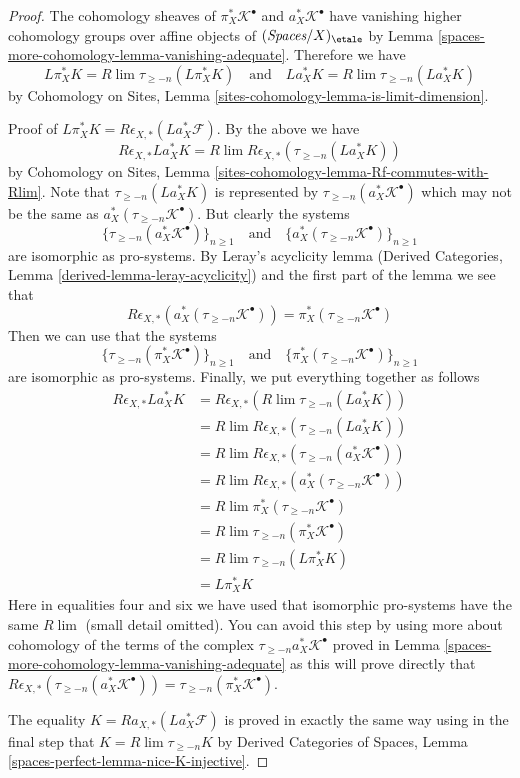 \begin{proof}
\medskip\noindent
The cohomology sheaves of
$\pi_X^*\mathcal{K}^\bullet$ and $a_X^*\mathcal{K}^\bullet$
have vanishing higher cohomology
groups over affine objects of $(\textit{Spaces}/X)_\etale$ by
Lemma \ref{spaces-more-cohomology-lemma-vanishing-adequate}.
Therefore we have
$$
L\pi_X^*K = R\lim \tau_{\geq -n}(L\pi_X^*K)
\quad\text{and}\quad
La_X^*K = R\lim \tau_{\geq -n}(La_X^*K)
$$
by Cohomology on Sites, Lemma \ref{sites-cohomology-lemma-is-limit-dimension}.

\medskip\noindent
Proof of $L\pi_X^*K = R\epsilon_{X, *}(La_X^*\mathcal{F})$.
By the above we have
$$
R\epsilon_{X, *}La_X^*K =
R\lim R\epsilon_{X, *}(\tau_{\geq -n}(La_X^*K))
$$
by Cohomology on Sites, Lemma
\ref{sites-cohomology-lemma-Rf-commutes-with-Rlim}.
Note that $\tau_{\geq -n}(La_X^*K)$ is represented by
$\tau_{\geq -n}(a_X^*\mathcal{K}^\bullet)$ which may not be the
same as $a_X^*(\tau_{\geq -n}\mathcal{K}^\bullet)$.
But clearly the systems
$$
\{\tau_{\geq -n}(a_X^*\mathcal{K}^\bullet)\}_{n \geq 1}
\quad\text{and}\quad
\{a_X^*(\tau_{\geq -n}\mathcal{K}^\bullet)\}_{n \geq 1}
$$
are isomorphic as pro-systems.
By Leray's acyclicity lemma
(Derived Categories, Lemma \ref{derived-lemma-leray-acyclicity})
and the first part of the lemma we see that
$$
R\epsilon_{X, *}(a_X^*(\tau_{\geq -n}\mathcal{K}^\bullet)) =
\pi_X^*(\tau_{\geq -n}\mathcal{K}^\bullet)
$$
Then we can use that the systems
$$
\{\tau_{\geq -n}(\pi_X^*\mathcal{K}^\bullet)\}_{n \geq 1}
\quad\text{and}\quad
\{\pi_X^*(\tau_{\geq -n}\mathcal{K}^\bullet)\}_{n \geq 1}
$$
are isomorphic as pro-systems. Finally, we put everything together as follows
\begin{align*}
R\epsilon_{X, *}La_X^*K
& =
R\epsilon_{X, *} (R\lim \tau_{\geq -n}(La_X^*K)) \\
& =
R\lim R\epsilon_{X, *}(\tau_{\geq -n}(La_X^*K)) \\
& =
R\lim R\epsilon_{X, *}(\tau_{\geq -n}(a_X^*\mathcal{K}^\bullet)) \\
& =
R\lim R\epsilon_{X, *}(a_X^*(\tau_{\geq -n}\mathcal{K}^\bullet)) \\
& =
R\lim \pi_X^*(\tau_{\geq -n}\mathcal{K}^\bullet) \\
& =
R\lim \tau_{\geq -n}(\pi_X^*\mathcal{K}^\bullet) \\
& =
R\lim \tau_{\geq -n}(L\pi_X^*K) \\
& =
L\pi_X^*K
\end{align*}
Here in equalities four and six we have used that isomorphic
pro-systems have the same $R\lim$ (small detail omitted).
You can avoid this step by using more about cohomology of the terms
of the complex $\tau_{\geq -n}a_X^*\mathcal{K}^\bullet$ proved
in Lemma \ref{spaces-more-cohomology-lemma-vanishing-adequate} as this will prove
directly that $R\epsilon_{X, *}(\tau_{\geq -n}(a_X^*\mathcal{K}^\bullet)) =
\tau_{\geq -n}(\pi_X^*\mathcal{K}^\bullet)$.

\medskip\noindent
The equality $K = Ra_{X, *}(La_X^*\mathcal{F})$ is
proved in exactly the same way using in the final step that
$K = R\lim \tau_{\geq -n}K$ by
Derived Categories of Spaces, Lemma \ref{spaces-perfect-lemma-nice-K-injective}.
\end{proof}

